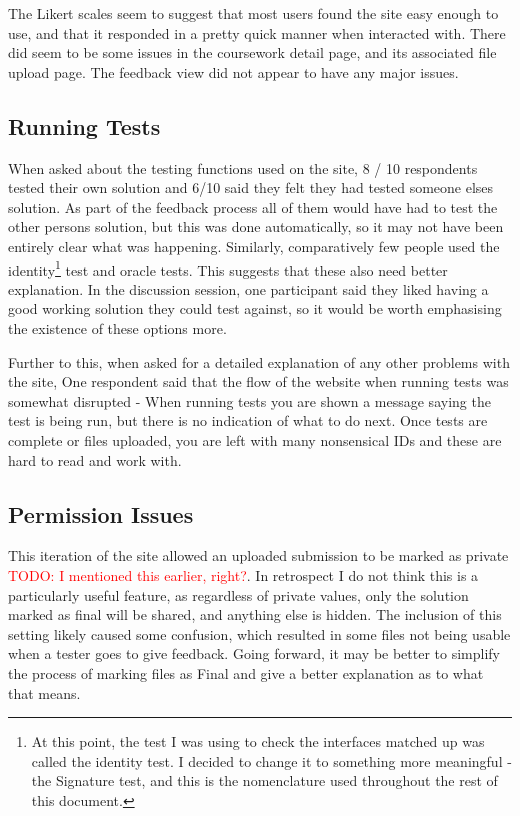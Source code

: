 \documentclass[a4paper,11pt]{report}
\newcommand{\todo}[1]{\textcolor{red}{TODO: #1}}
\begin{document}
The Likert scales seem to suggest that most users found the site easy enough to use, and that it responded in a pretty quick manner when interacted with. There did seem to be some issues in the coursework detail page, and its associated file upload page. The feedback view did not appear to have any major issues.\par
\subsection{Running Tests}
When asked about the testing functions used on the site, 8 / 10 respondents tested their own solution and 6/10 said they felt they had tested someone elses solution. As part of the feedback process all of them would have had to test the other persons solution, but this was done automatically, so it may not have been entirely clear what was happening. Similarly, comparatively few people used the identity\footnote{At this point, the test I was using to check the interfaces matched up was called the identity test. I decided to change it to something more meaningful - the Signature test, and this is the nomenclature used throughout the rest of this document.} test and oracle tests. This suggests that these also need better explanation. In the discussion session, one participant said they liked having a good working solution they could test against, so it would be worth emphasising the existence of these options more.\par
Further to this, when asked for a detailed explanation of any other problems with the site, One respondent said that the flow of the website when running tests was somewhat disrupted - When running tests you are shown a message saying the test is being run, but there is no indication of what to do next. Once tests are complete or files uploaded, you are left with many nonsensical IDs and these are hard to read and work with.
\subsection{Permission Issues}
\label{sec:permiss}
This iteration of the site allowed an uploaded submission to be marked as private \todo{I mentioned this earlier, right?}. In retrospect I do not think this is a particularly useful feature, as regardless of private values, only the solution marked as final will be shared, and anything else is hidden. The inclusion of this setting likely caused some confusion, which resulted in some files not being usable when a tester goes to give feedback. Going forward, it may be better to simplify the process of marking files as Final and give a better explanation as to what that means.
\end{document}
